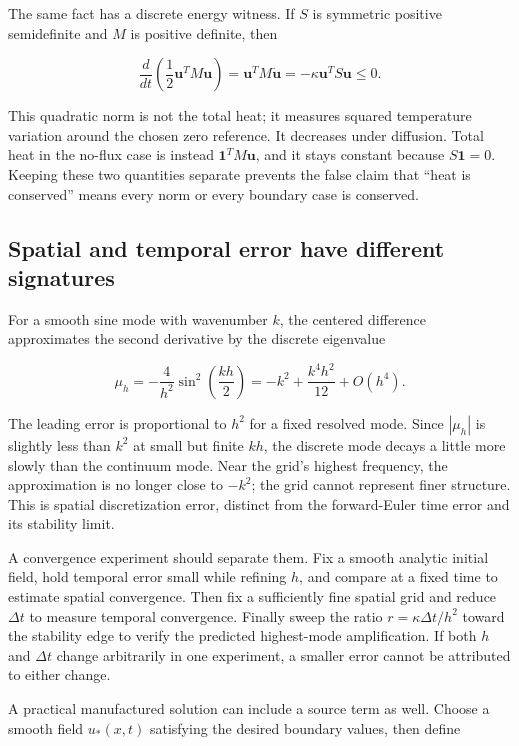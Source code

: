 The same fact has a discrete energy witness. If \(S\) is symmetric positive semidefinite and \(M\) is positive definite, then

\[
\frac{d}{dt}\left(\frac12\mathbf u^TM\mathbf u\right)
=\mathbf u^TM\dot{\mathbf u}
=-\kappa\mathbf u^TS\mathbf u\le0.
\]

This quadratic norm is not the total heat; it measures squared temperature variation around the chosen zero reference. It decreases under diffusion. Total heat in the no-flux case is instead \(\mathbf1^TM\mathbf u\), and it stays constant because \(S\mathbf1=0\). Keeping these two quantities separate prevents the false claim that ``heat is conserved'' means every norm or every boundary case is conserved.

\subsection{Spatial and temporal error have different signatures}\label{02-foundations-ii-ch025-spatial-and-temporal-error-have-different-signatures}

For a smooth sine mode with wavenumber \(k\), the centered difference approximates the second derivative by the discrete eigenvalue

\[
\mu_h=-\frac{4}{h^2}\sin^2\left(\frac{kh}{2}\right)
=-k^2+\frac{k^4h^2}{12}+O(h^4).
\]

The leading error is proportional to \(h^2\) for a fixed resolved mode. Since \(|\mu_h|\) is slightly less than \(k^2\) at small but finite \(kh\), the discrete mode decays a little more slowly than the continuum mode. Near the grid's highest frequency, the approximation is no longer close to \(-k^2\); the grid cannot represent finer structure. This is spatial discretization error, distinct from the forward-Euler time error and its stability limit.

A convergence experiment should separate them. Fix a smooth analytic initial field, hold temporal error small while refining \(h\), and compare at a fixed time to estimate spatial convergence. Then fix a sufficiently fine spatial grid and reduce \(\Delta t\) to measure temporal convergence. Finally sweep the ratio \(r=\kappa\Delta t/h^2\) toward the stability edge to verify the predicted highest-mode amplification. If both \(h\) and \(\Delta t\) change arbitrarily in one experiment, a smaller error cannot be attributed to either change.

A practical manufactured solution can include a source term as well. Choose a smooth field \(u_*(x,t)\) satisfying the desired boundary values, then define

